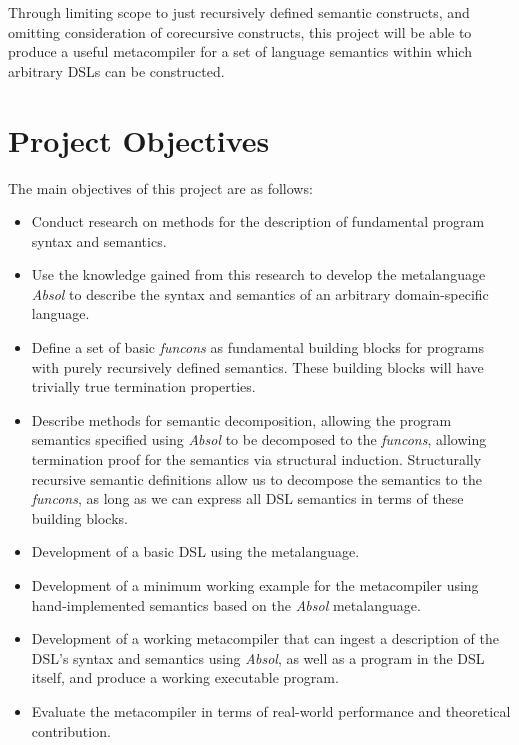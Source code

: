 \documentclass[a4paper,11pt]{report}
\begin{document}
Through limiting scope to just recursively defined semantic constructs, and omitting consideration of corecursive constructs, this project will be able to produce a useful metacompiler for a set of language semantics within which arbitrary DSLs can be constructed. 


\section{Project Objectives} %
\label{sec:project_objectives}
The main objectives of this project are as follows:
\begin{itemize}
    \item Conduct research on methods for the description of fundamental program syntax and semantics.
    \item Use the knowledge gained from this research to develop the metalanguage \textit{Absol} to describe the syntax and semantics of an arbitrary domain-specific language.
    \item Define a set of basic \textit{funcons} as fundamental building blocks for programs with purely recursively defined semantics. 
    These building blocks will have trivially true termination properties.
    \item Describe methods for semantic decomposition, allowing the program semantics specified using \textit{Absol} to be decomposed to the \textit{funcons}, allowing termination proof for the semantics via structural induction.
    Structurally recursive semantic definitions allow us to decompose the semantics to the \textit{funcons}, as long as we can express all DSL semantics in terms of these building blocks. 
    \item Development of a basic DSL using the metalanguage.
    \item Development of a minimum working example for the metacompiler using hand-implemented semantics based on the \textit{Absol} metalanguage.
    \item Development of a working metacompiler that can ingest a description of the DSL's syntax and semantics using \textit{Absol}, as well as a program in the DSL itself, and produce a working executable program.
    \item Evaluate the metacompiler in terms of real-world performance and theoretical contribution.
\end{itemize}

\end{document}
